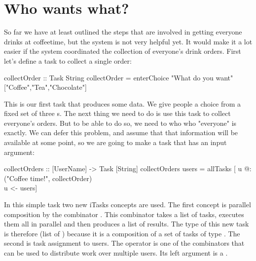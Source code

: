 \documentclass[a4paper,11pt]{article}
\begin{document}
\section{Who wants what?}
So far we have at least outlined the steps that are involved in getting everyone drinks at coffeetime, but the system is not very helpful yet.
It would make it a lot easier if the system coordinated the collection of everyone's drink orders. First let's define a task to collect a single order:
\begin{CleanCodeN}
collectOrder :: Task String
collectOrder = enterChoice "What do you want" ["Coffee","Tea","Chocolate"]
\end{CleanCodeN}
This is our first task that produces some data. We give people a choice from a fixed set of three s. The next thing we need to do is use this task to collect everyone's orders. But to be able to do so, we need to who who "everyone" is exactly. We can defer this problem, and assume that that information will be available at some point, so we are going to make a task that has an input argument:
\begin{CleanCodeN}
collectOrders :: [UserName] -> Task [String]
collectOrders users = allTasks [ u @: ("Coffee time!", collectOrder) \\ u <- users]
\end{CleanCodeN}
In this simple task two new iTasks concepts are used. The first concept is parallel composition by the combinator . This combinator takes a list of tasks, executes them all in parallel and then produces a list of results. The type of this new task is therefore \CleanInline{[String]} (list of ) because it is a composition of a set of tasks of type . The second is task assignment to users. The  operator is one of the combinators that can be used to distribute work over multiple users. Its left argument is a .
\end{document}
